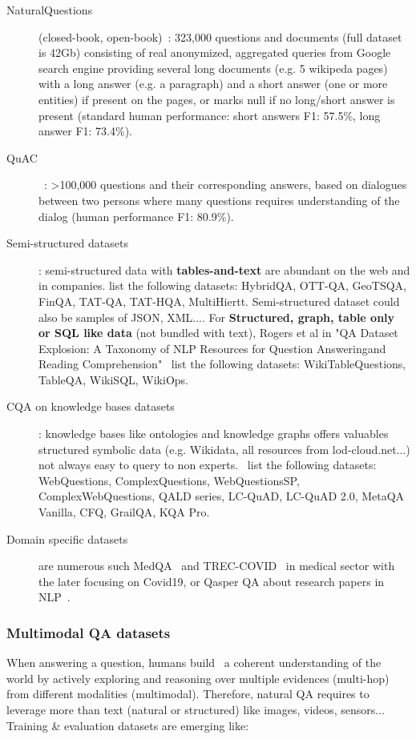 \documentclass[acmsmall]{acmart}
\begin{document}
\begin{description}
    \item [NaturalQuestions] (closed-book, open-book)~\citep{kwiatkowskiNaturalQuestionsBenchmark2019}: 323,000 questions and documents (full dataset is 42Gb) consisting of real anonymized, aggregated queries from  Google search engine providing several long documents (e.g. 5 wikipeda pages) with a long answer (e.g. a paragraph) and a short answer (one  or  more  entities) if present on the pages, or marks null if no long/short answer is present (standard human performance: short answers F1: 57.5\%, long answer F1: 73.4\%).
    \item [QuAC]~\citep{choiQuACQuestionAnswering2018}: >100,000 questions and their corresponding answers, based on dialogues between two persons where many questions requires understanding of the dialog (human performance F1: 80.9\%).
    \item [Semi-structured datasets]: semi-structured data with \textbf{tables-and-text} are abundant on the web and in companies. \citet{wangSurveyTableandTextHybridQA2022} list the following datasets: HybridQA, OTT-QA, GeoTSQA, FinQA, TAT-QA, TAT-HQA, MultiHiertt. Semi-structured dataset could also be samples of JSON, XML....
For \textbf{Structured, graph, table only or SQL like data} (not bundled with text), Rogers et al in "QA Dataset Explosion: A Taxonomy of NLP Resources for Question Answeringand Reading Comprehension"~\citep{rogersQADatasetExplosion2022} list the following datasets: WikiTableQuestions, TableQA, WikiSQL, WikiOps.
    \item [CQA on knowledge bases datasets]: knowledge bases like ontologies and knowledge graphs offers valuables structured symbolic data (e.g. Wikidata, all resources from lod-cloud.net...) not always easy to query to non experts. \citet{lanComplexKnowledgeBase2022} list the following datasets: WebQuestions, ComplexQuestions, WebQuestionsSP, ComplexWebQuestions, QALD series, LC-QuAD, LC-QuAD 2.0, MetaQA Vanilla, CFQ, GrailQA, KQA Pro.
    \item [Domain specific datasets] are numerous such MedQA~\citep{jinWhatDiseaseDoes2020} and TREC-COVID~\citep{voorheesTRECCOVIDConstructingPandemic2020} in medical sector with the later focusing on Covid19, or Qasper QA about research papers in NLP~\citep{dasigiDatasetInformationSeekingQuestions2021}.
\end{description}

\subsubsection{Multimodal QA datasets}
When answering a question, humans build~\citep{yangEnhancingMultimodalMultihop2022} a coherent understanding of the world by actively exploring and  reasoning over multiple evidences (multi-hop) from different modalities (multimodal). Therefore, natural QA requires to leverage more than text (natural or structured) like images, videos, sensors... Training \& evaluation datasets are emerging like:
\end{document}
